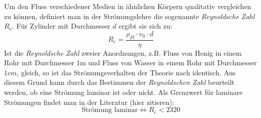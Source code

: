 Um den Fluss verschiedener Medien in ähnlichen Körpern qualitativ vergleichen zu können, definiert man in der Strömungslehre die sogenannte \emph{Reynoldsche Zahl} $R_e$. Für
Zylinder mit Durchmesser $d$ ergibt sie sich zu:
\begin{equation}
  R_e = \frac{\rho_{Fl} \cdot v_0 \cdot d}{\eta}
  \label{eq: reynolds}
\end{equation}
Ist die \emph{Reynoldsche Zahl} zweier Anordnungen, z.B. Fluss von Honig in einem Rohr mit Durchmesser $1 \si{\meter}$ und Fluss von Wasser in einem Rohr mit Durchmesser $1\si{cm}$, gleich, so
ist das Strömungsverhalten der Theorie nach identisch. Aus diesem Grund kann durch das Bestimmen der \emph{Reynoldschen Zahl} beurteilt werden, ob eine Strömung laminar ist oder nicht.
Als Grenzwert für laminare Strömungen findet man in der Literatur (hier zitieren):
\begin{equation}
  \text{Strömung laminar} \Leftrightarrow R_e < 2320
  \label{eq: laminar}
\end{equation}
